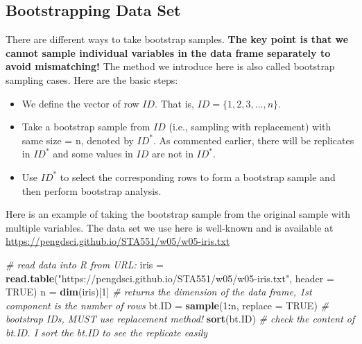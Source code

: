 \documentclass[
]{book}
\newenvironment{Shaded}{\begin{snugshade}}{\end{snugshade}}
\newcommand{\AttributeTok}[1]{\textcolor[rgb]{0.13,0.29,0.53}{#1}}
\newcommand{\CommentTok}[1]{\textcolor[rgb]{0.56,0.35,0.01}{\textit{#1}}}
\newcommand{\ConstantTok}[1]{\textcolor[rgb]{0.56,0.35,0.01}{#1}}
\newcommand{\DecValTok}[1]{\textcolor[rgb]{0.00,0.00,0.81}{#1}}
\newcommand{\FunctionTok}[1]{\textcolor[rgb]{0.13,0.29,0.53}{\textbf{#1}}}
\newcommand{\NormalTok}[1]{#1}
\newcommand{\OtherTok}[1]{\textcolor[rgb]{0.56,0.35,0.01}{#1}}
\newcommand{\SpecialCharTok}[1]{\textcolor[rgb]{0.81,0.36,0.00}{\textbf{#1}}}
\newcommand{\StringTok}[1]{\textcolor[rgb]{0.31,0.60,0.02}{#1}}
\begin{document}
\hypertarget{bootstrapping-data-set}{%
\subsection{Bootstrapping Data Set}\label{bootstrapping-data-set}}

There are different ways to take bootstrap samples. \textbf{The key point is that we cannot sample individual variables in the data frame separately to avoid mismatching!} The method we introduce here is also called bootstrap sampling cases. Here are the basic steps:

\begin{itemize}
\item
  We define the vector of row \(ID\). That is, \(ID = \{1, 2, 3, ..., n\}\).
\item
  Take a bootstrap sample from \(ID\) (i.e., sampling with replacement) with same size = n, denoted by \(ID^*\). As commented earlier, there will be replicates in \(ID^*\) and some values in \(ID\) are not in \(ID^*\).
\item
  Use \(ID^*\) to select the corresponding rows to form a bootstrap sample and then perform bootstrap analysis.
\end{itemize}

Here is an example of taking the bootstrap sample from the original sample with multiple variables. The data set we use here is well-known and is available at \url{https://pengdsci.github.io/STA551/w05/w05-iris.txt}

\begin{Shaded}
\begin{Highlighting}[]
\CommentTok{\# read data into R from URL: }
\NormalTok{iris }\OtherTok{=} \FunctionTok{read.table}\NormalTok{(}\StringTok{"https://pengdsci.github.io/STA551/w05/w05{-}iris.txt"}\NormalTok{, }\AttributeTok{header =} \ConstantTok{TRUE}\NormalTok{)}
\NormalTok{n }\OtherTok{=} \FunctionTok{dim}\NormalTok{(iris)[}\DecValTok{1}\NormalTok{]        }\CommentTok{\# returns the dimension of the data frame, 1st component is the number of rows            }
\NormalTok{bt.ID }\OtherTok{=} \FunctionTok{sample}\NormalTok{(}\DecValTok{1}\SpecialCharTok{:}\NormalTok{n, }\AttributeTok{replace =} \ConstantTok{TRUE}\NormalTok{)   }\CommentTok{\# bootstrap IDs, MUST use replacement method!}
\FunctionTok{sort}\NormalTok{(bt.ID)                 }\CommentTok{\# check the content of bt.ID. I sort the bt.ID to see the replicate easily}
\end{Highlighting}
\end{Shaded}
\end{document}
